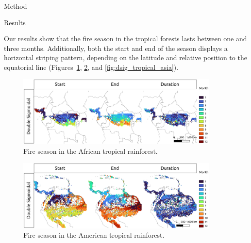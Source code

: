 \documentclass[20pt]{beamer}
\begin{document}
\begin{frame}[fragile,t]
\begin{columns}[t]
\begin{column}{0.33\linewidth}
\begin{block}{Method\vphantom{g}}
    \end{block}

    \vspace{0.5cm}

    \begin{block}{Results\vphantom{g}}

    \vspace{0.5cm}

Our results show that the fire season in the tropical forests lasts between one and three months.
Additionally, both the start and end of the season displays a horizontal striping pattern, depending on the latitude and relative position to the equatorial line (Figures~\ref{fig:dsig_tropical_africa}, \ref{fig:dsig_tropical_america}, and \ref{fig:dsig_tropical_asia}).

    \vspace{0.5cm}

\begin{figure}[ht]
\centering
\includegraphics[width=0.9\textwidth]{figures/dsig_tropical_africa.png}
\caption{Fire season in the African tropical rainforest.}
\label{fig:dsig_tropical_africa}
\end{figure}

    \vspace{0.5cm}

\begin{figure}[ht]
\centering
\includegraphics[width=0.9\textwidth]{figures/dsig_tropical_america.png}
\caption{Fire season in the American tropical rainforest.}
\label{fig:dsig_tropical_america}
\end{figure}

    \vspace{0.5cm}


\end{block}
\end{column}
\end{columns}
\end{frame}
\end{document}
